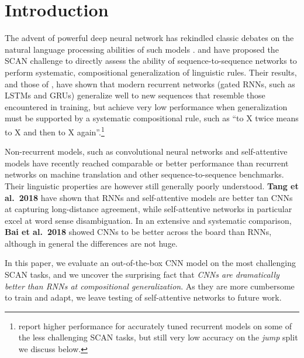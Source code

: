 \section{Introduction}
\label{sec:intro}

The advent of powerful deep neural network has rekindled classic
debates on the natural language processing abilities of such models
\cite[e.g.,][]{Kirov:Cotterell:2018,Linzen:etal:2018,McCoy:etal:2018,Pater:2018}. \citet{Lake:Baroni:2017}
and \citet{Loula:etal:2018} have proposed the SCAN challenge to
directly assess the ability of sequence-to-sequence networks to
perform systematic, compositional generalization of linguistic
rules. Their results, and those of \citet{Bastings:etal:2018}, have
shown that modern recurrent networks (gated RNNs, such as LSTMs and GRUs) generalize well
to new sequences that resemble those encountered in training,
but achieve very low performance when generalization must be
supported by a systematic compositional rule, such as ``to X twice
means to X and then to X again''.\footnote{\citet{Bastings:etal:2018}
  report higher performance for accurately tuned recurrent models on
  some of the less challenging SCAN tasks, but still very low accuracy on the \emph{jump} split we discuss below.}

Non-recurrent models, such as convolutional neural networks
\cite[CNNs,][]{kalchbrenner:etal:2016, gehring:etal:2016,
  gehring:etal:2017} and self-attentive models
\cite{vaswani:etal:2017, chen:etal:2018} have recently reached
comparable or better performance than recurrent networks on machine
translation and other sequence-to-sequence benchmarks. Their
linguistic properties are however  still generally poorly
understood. \textbf{Tang et al.~2018} have shown that RNNs and
self-attentive models are better tan CNNs at capturing long-distance
agreement, while self-attentive networks in particular excel at
word sense disambiguation. In an extensive and systematic comparison,
\textbf{Bai et al.~2018} showed CNNs to be better across the board
than RNNs, although in general the differences are not huge.


In this paper, we evaluate an out-of-the-box CNN model on the most
challenging SCAN tasks, and we uncover the surprising fact that
\emph{CNNs are dramatically better than RNNs at compositional
  generalization}. As they are more cumbersome to
train and adapt, we leave testing of self-attentive networks to future
work.

